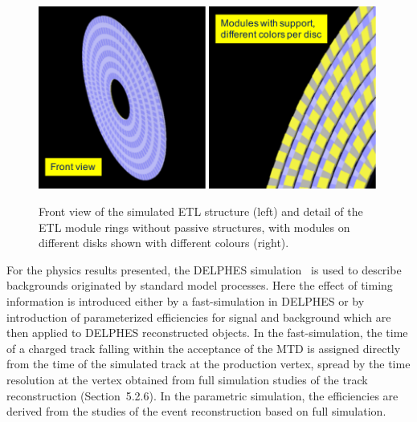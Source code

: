 \begin{figure}[hbtp]
\centering
\includegraphics[width=0.49\textwidth]{fig/performance/ETL1.pdf}
\includegraphics[width=0.49\textwidth]{fig/performance/ETL2.pdf}
\caption{Front view of the simulated ETL structure (left) and detail of the ETL module rings without passive structures, with modules on different disks shown with different colours (right).}
\label{fig:ETL1}
\end{figure}


For the physics results presented, the DELPHES simulation~\cite{deFavereau:2013fsa} is used to describe backgrounds originated by standard model processes. 
Here the effect of timing information is introduced either by a fast-simulation in DELPHES or by introduction of parameterized efficiencies for signal and background which are then applied to DELPHES reconstructed objects. 
In the fast-simulation, the time of a charged track falling within the acceptance of the MTD is assigned directly from the time of the simulated track at the production vertex, spread by the time resolution at the vertex obtained from full simulation studies of the track reconstruction (Section~5.2.6). 
In the parametric simulation, the efficiencies are derived from the studies of the event reconstruction based on full simulation. 

